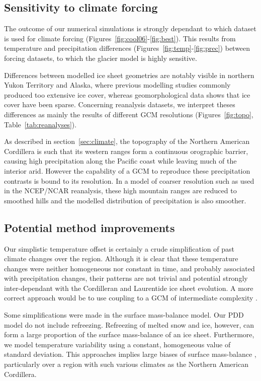 \subsection{Sensitivity to climate forcing}

The outcome of our numerical simulations is strongly dependant to which dataset is used for climate forcing (Figures~\ref{fig:cool06}-\ref{fig:best}). This results from temperature and precipitation differences (Figures~\ref{fig:temp}-\ref{fig:prec}) between forcing datasets, to which the glacier model is highly sensitive.

Differences between modelled ice sheet geometries are notably visible in northern Yukon Territory and Alaska, where previous modelling studies commonly produced too extensive ice cover, whereas geomorphological data shows that ice cover have been sparse. Concerning reanalysis datasets, we interpret theses differences as mainly the results of different GCM resolutions (Figures~\ref{fig:topo}, Table~\ref{tab:reanalyses}).

As described in section~\ref{sec:climate}, the topography of the Northern American Cordillera is such that its western ranges form a continuous orographic barrier, causing high precipitation along the Pacific coast while leaving much of the interior arid. However the capability of a GCM to reproduce these precipitation contrasts is bound to its resolution. In a model of coarser resolution such as used in the NCEP/NCAR reanalysis, these high mountain ranges are reduced to smoothed hills and the modelled distribution of precipitation is also smoother.

\subsection{Potential method improvements}

Our simplistic temperature offset is certainly a crude simplification of past climate changes over the region. Although it is clear that these temperature changes were neither homogeneous nor constant in time, and probably associated with precipitation changes, their patterns are not trivial and potential strongly inter-dependant with the Cordilleran and Laurentide ice sheet evolution. A more correct approach would be to use coupling to a GCM of intermediate complexity \citep{yoshimori-etal-2001,calov-etal-2002,abeouchi-etal-2007,charbit-etal-2013}.

Some simplifications were made in the surface mass-balance model. Our PDD model do not include refreezing. Refreezing of melted snow and ice, however, can form a large proportion of the surface mass-balance of an ice sheet\needref. Furthermore, we model temperature variability using a constant, homogeneous value of standard deviation. This approaches implies large biases of surface mass-balance \citep{charbit-etal-2013,rau-rogozhina-2013,seguinot-inreview}, particularly over a region with such various climates as the Northern American Cordillera.


